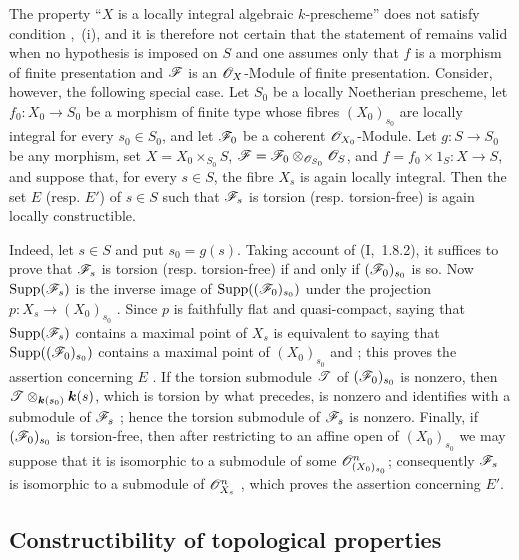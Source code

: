 \begin{remark}[9.4.9]
\label{IV.9.4.9}
The property ``$X$ is a locally integral algebraic $k$-prescheme'' does not satisfy condition ,~(i), and it is therefore not certain that the statement of  remains valid when no hypothesis is imposed on $S$ and one assumes only that $f$ is a morphism of finite presentation and $\mathscr{F}$ is an $\mathscr{O}_X$-Module of finite presentation. Consider, however, the following special case. Let $S_0$ be a locally Noetherian prescheme, let $f_0:X_0\to S_0$ be a morphism of finite type whose fibres $(X_0)_{s_0}$ are locally integral for every $s_0\in S_0$, and let $\mathscr{F}_0$ be a coherent $\mathscr{O}_{X_0}$-Module. Let $g:S\to S_0$ be any morphism, set
$X=X_0\times_{S_0}S$, $\mathscr{F}=\mathscr{F}_0\otimes_{\mathscr{O}_{S_0}}\mathscr{O}_S$, and $f=f_0\times 1_S:X\to S$, and suppose that, for every $s\in S$, the fibre $X_s$ is again locally integral. Then the set $E$ (resp. $E'$) of $s\in S$ such that $\mathscr{F}_s$ is torsion (resp. torsion-free)
is again locally constructible.

Indeed, let $s\in S$ and put $s_0=g(s)$. Taking account of (I,~1.8.2), it suffices to prove that $\mathscr{F}_s$ is torsion (resp. torsion-free) if and only if $(\mathscr{F}_0)_{s_0}$ is so. Now $\operatorname{Supp}(\mathscr{F}_s)$ is the inverse image of $\operatorname{Supp}((\mathscr{F}_0)_{s_0})$ under the projection $p:X_s\to(X_0)_{s_0}$ . Since $p$ is faithfully flat and quasi-compact, saying that $\operatorname{Supp}(\mathscr{F}_s)$ contains a maximal point of $X_s$ is equivalent to saying that $\operatorname{Supp}((\mathscr{F}_0)_{s_0})$ contains a maximal point of $(X_0)_{s_0}$  and ; this proves the assertion concerning $E$ . If the torsion submodule $\mathscr{T}$ of $(\mathscr{F}_0)_{s_0}$ is nonzero, then $\mathscr{T}\otimes_{\boldsymbol{k}(s_0)}\boldsymbol{k}(s)$, which is torsion by what precedes, is nonzero and identifies with a submodule of $\mathscr{F}_s$ ; hence the torsion submodule of $\mathscr{F}_s$ is nonzero. Finally, if $(\mathscr{F}_0)_{s_0}$ is torsion-free, then after restricting to an affine open of $(X_0)_{s_0}$ we may suppose that it is isomorphic to a submodule of some $\mathscr{O}_{(X_0)_{s_0}}^n$; consequently $\mathscr{F}_s$ is isomorphic to a submodule of $\mathscr{O}_{X_s}^n$ , which proves the assertion concerning $E'$.
\end{remark}

\subsection{Constructibility of topological properties}
\label{subsection:IV.9.5}


